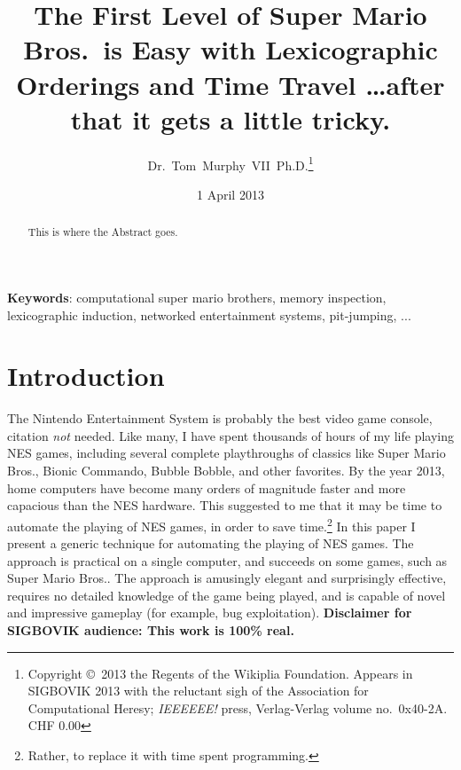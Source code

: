 \documentclass[twocolumn]{article}
\begin{document}
 

\title{The First Level of Super Mario Bros.~is Easy with
       Lexicographic Orderings and Time Travel
       {\normalsize \ldots after that it gets a little tricky.}}
\author{Dr.~Tom~Murphy~VII~Ph.D.\thanks{
Copyright \copyright\ 2013 the Regents of the Wikiplia
Foundation. Appears in SIGBOVIK 2013 with the reluctant sigh of the
Association for Computational Heresy; {\em IEEEEEE!} press,
Verlag-Verlag volume no.~0x40-2A.
CHF 0.00}
}


\renewcommand\>{$>$}
\newcommand\<{$<$}

\date{1 April 2013}

\maketitle

\begin{abstract}
This is where the Abstract goes.
\end{abstract}

\vspace{1em}
{\noindent \small {\bf Keywords}:
  computational super mario brothers, memory inspection, lexicographic induction, networked entertainment systems, pit-jumping, ...

}

\section*{Introduction}
The Nintendo Entertainment System is probably the best video game console, citation {\it not} needed. Like many, I have spent thousands of hours of my life playing NES games, including several complete playthroughs of classics like Super Mario Bros., Bionic Commando, Bubble Bobble, and other favorites. By the year 2013, home computers have become many orders of magnitude faster and more capacious than the NES hardware. This suggested to me that it may be time to automate the playing of NES games, in order to save time.\footnote{Rather, to replace it with time spent programming.} In this paper I present a generic technique for automating the playing of NES games. The approach is practical on a single computer, and succeeds on some games, such as Super Mario Bros.. The approach is amusingly elegant and surprisingly effective, requires no detailed knowledge of the game being played, and is capable of novel and impressive gameplay (for example, bug exploitation). {\bf Disclaimer for SIGBOVIK audience: This work is 100\% real.}
\end{document}

